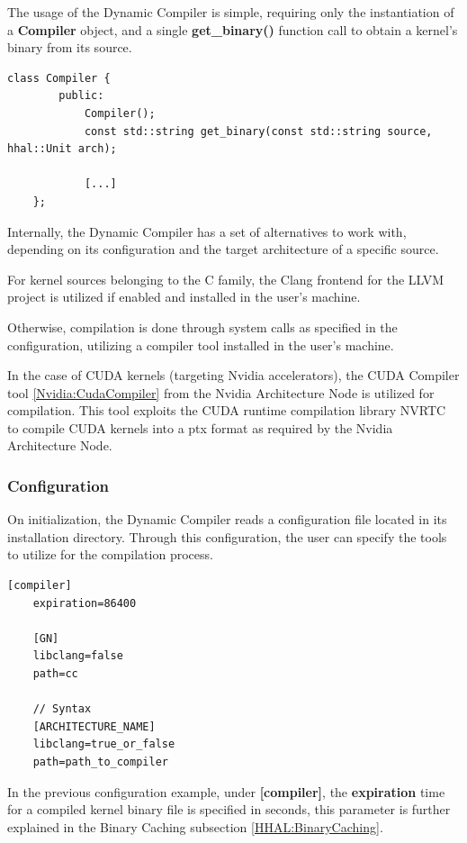 The usage of the Dynamic Compiler is simple, requiring only the instantiation of a \textbf{Compiler} object, and a single \textbf{get\_binary()} function call to obtain a kernel's binary from its source.

\begin{lstlisting}[style=CStyle, caption=HHAL Dynamic Compiler - Compiler class]
    class Compiler {
        public:
            Compiler();
            const std::string get_binary(const std::string source, hhal::Unit arch);

            [...]
    };
\end{lstlisting}

Internally, the Dynamic Compiler has a set of alternatives to work with, depending on its configuration and the target architecture of a specific source.

For kernel sources belonging to the C family, the Clang frontend for the LLVM project \cite{clang_llvm} is utilized if enabled and installed in the user's machine.

Otherwise, compilation is done through system calls as specified in the configuration, utilizing a compiler tool installed in the user's machine.

In the case of CUDA kernels (targeting Nvidia accelerators), the CUDA Compiler tool \ref{Nvidia:CudaCompiler} from the Nvidia Architecture Node is utilized for compilation. This tool exploits the CUDA runtime compilation library NVRTC to compile CUDA kernels into a ptx format as required by the Nvidia Architecture Node.

\subsubsection{Configuration}

On initialization, the Dynamic Compiler reads a configuration file located in its installation directory. Through this configuration, the user can specify the tools to utilize for the compilation process.

\begin{lstlisting}[style=CStyle, caption=HHAL Dynamic Compiler - Configuration example]
    [compiler]
    expiration=86400

    [GN]
    libclang=false
    path=cc

    // Syntax
    [ARCHITECTURE_NAME]
    libclang=true_or_false
    path=path_to_compiler
\end{lstlisting}

In the previous configuration example, under \textbf{[compiler]}, the \textbf{expiration} time for a compiled kernel binary file is specified in seconds, this parameter is further explained in the Binary Caching subsection \ref{HHAL:BinaryCaching}.

